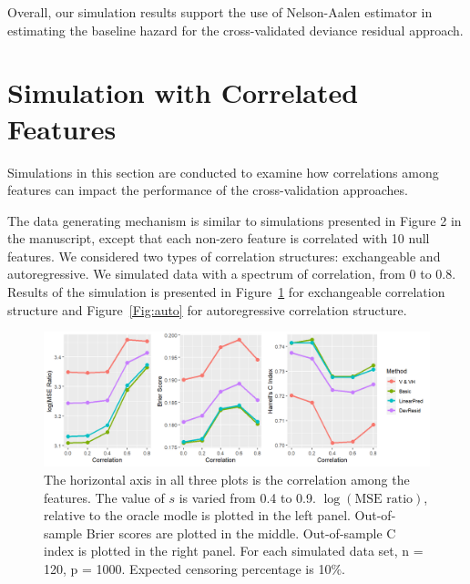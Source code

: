\documentclass{article}
\begin{document}
Overall, our simulation results support the use of Nelson-Aalen estimator in estimating the baseline hazard for the cross-validated deviance residual approach.

\section{Simulation with Correlated Features}

Simulations in this section are conducted to examine how correlations among features can impact the performance of the cross-validation approaches.

The data generating mechanism is similar to simulations presented in Figure 2 in the manuscript, except that each non-zero feature is correlated with 10 null features. We considered two types of correlation structures: exchangeable and autoregressive. We simulated data with a spectrum of correlation, from 0 to 0.8. Results of the simulation is presented in Figure~\ref{Fig:ex} for exchangeable correlation structure and Figure~\ref{Fig:auto} for autoregressive correlation structure.

\begin{figure}[ht]
  \centering
  \includegraphics[width=\textwidth]{manuscript_figure/figure_2_ex.png}
  \caption{\label{Fig:ex} The horizontal axis in all three plots is the correlation among the features. The value of $s$ is varied from 0.4 to 0.9.  $\log(\text{MSE ratio})$, relative to the oracle modle is plotted in the left panel. Out-of-sample Brier scores are plotted in the middle. Out-of-sample C index is plotted in the right panel. For each simulated data set, n = 120, p = 1000. Expected censoring percentage is 10$\%$.}
\end{figure}	
\end{document}
